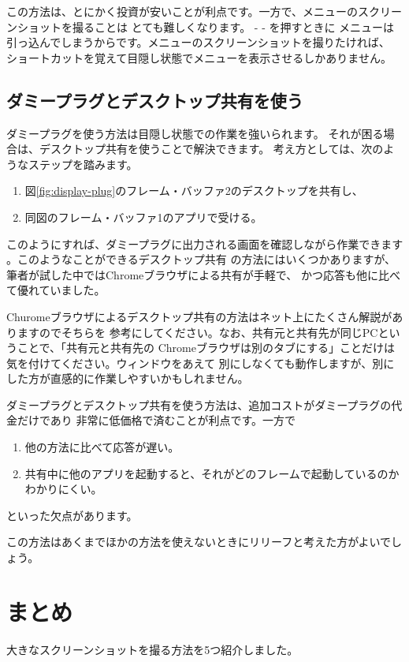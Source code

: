 この方法は、とにかく投資が安いことが利点です。一方で、メニューのスクリーンショットを撮ることは
とても難しくなります。 -  - を押すときに
メニューは引っ込んでしまうからです。メニューのスクリーンショットを撮りたければ、
ショートカットを覚えて目隠し状態でメニューを表示させるしかありません。



\subsection{ダミープラグとデスクトップ共有を使う}
ダミープラグを使う方法は目隠し状態での作業を強いられます。
それが困る場合は、デスクトップ共有を使うことで解決できます。
考え方としては、次のようなステップを踏みます。

\begin{enumerate}
  \item 図\ref{fig:display-plug}のフレーム・バッファ2のデスクトップを共有し、
  \item 同図のフレーム・バッファ1のアプリで受ける。
\end{enumerate}

このようにすれば、ダミープラグに出力される画面を確認しながら作業できます
。このようなことができるデスクトップ共有
の方法にはいくつかありますが、筆者が試した中ではChromeブラウザによる共有が手軽で、
かつ応答も他に比べて優れていました。

Churomeブラウザによるデスクトップ共有の方法はネット上にたくさん解説がありますのでそちらを
参考にしてください。なお、共有元と共有先が同じPCということで、「共有元と共有先の
Chromeブラウザは別のタブにする」ことだけは気を付けてください。ウィンドウをあえて
別にしなくても動作しますが、別にした方が直感的に作業しやすいかもしれません。

ダミープラグとデスクトップ共有を使う方法は、追加コストがダミープラグの代金だけであり
非常に低価格で済むことが利点です。一方で

\begin{enumerate}
  \item 他の方法に比べて応答が遅い。
  \item 共有中に他のアプリを起動すると、それがどのフレームで起動しているのかわかりにくい。
\end{enumerate}

といった欠点があります。

この方法はあくまでほかの方法を使えないときにリリーフと考えた方がよいでしょう。


\section{まとめ}
大きなスクリーンショットを撮る方法を5つ紹介しました。

